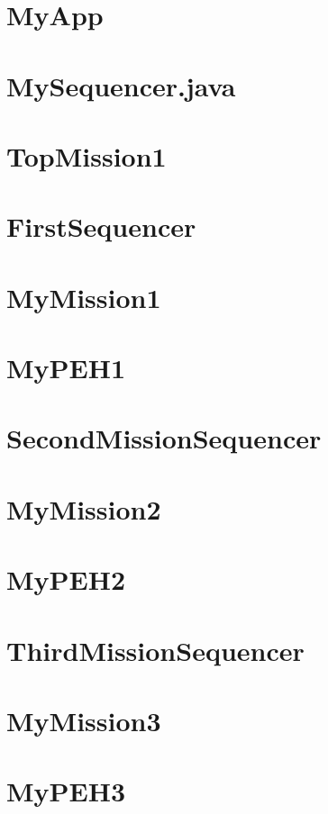 \documentclass{article}
\begin{document}
\section{MyApp}

\newpage

\section{MySequencer.java}

\newpage

\section{TopMission1}

\newpage

\section{FirstSequencer}

\newpage

\section{MyMission1}

\newpage

\section{MyPEH1}

\newpage

\section{SecondMissionSequencer}

\newpage

\section{MyMission2}

\newpage

\section{MyPEH2}

\newpage

\section{ThirdMissionSequencer}

\newpage


\section{MyMission3}

\newpage

\section{MyPEH3}

\newpage
\end{document}
